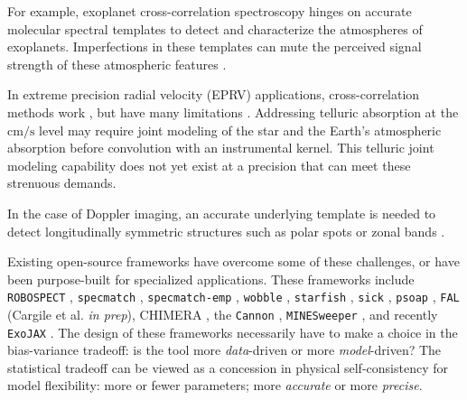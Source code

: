 \documentclass[modern]{aastex631}
\begin{document}
For example, exoplanet cross-correlation spectroscopy \citep{2013MNRAS.436L..35B} hinges on accurate molecular spectral templates to detect and characterize the atmospheres of exoplanets.  Imperfections in these templates can mute the perceived signal strength of these atmospheric features \citep{2015A&A...575A..20H}.

In extreme precision radial velocity (EPRV) applications, cross-correlation methods work \citep{2018A_A...620A..47D}, but have many limitations \citep{2022arXiv220110639Z}.  Addressing telluric absorption at the $\mathrm{cm/s}$ level may require joint modeling of the star and the Earth's atmospheric absorption before convolution with an instrumental kernel.  This telluric joint modeling capability does not yet exist at a precision that can meet these strenuous demands.

In the case of Doppler imaging, an accurate underlying template is needed to detect longitudinally symmetric structures \citep{1983PASP...95..565V,2021arXiv211006271L} such as polar spots \citep{roettenbacher16} or zonal bands \citep{Crossfield14,2021ApJ...906...64A}.

Existing open-source frameworks have overcome some of these challenges, or have been purpose-built for specialized applications.
These frameworks include \texttt{ROBOSPECT} \citep{2013PASP..125.1164W}, \texttt{specmatch} \citep{2015PhDT........82P}, \texttt{specmatch-emp} \citep{2017ApJ...836...77Y}, \texttt{wobble} \citep{2019AJ....158..164B}, \texttt{starfish} \citep{czekala15}, \texttt{sick} \citep{2016ApJS..223....8C}, \texttt{psoap} \citep{2017ApJ...840...49C}, \texttt{FAL} (Cargile et al. \emph{in prep}), CHIMERA \citep{2015ApJ...807..183L}, the \texttt{Cannon} \citep{2017ApJ...836....5H},  \texttt{MINESweeper} \citep{2020ApJ...900...28C}, and recently \texttt{ExoJAX} \citep{2022ApJS..258...31K}.
The design of these frameworks necessarily have to make a choice in the bias-variance tradeoff: is the tool more \emph{data}-driven or more \emph{model}-driven?  The statistical tradeoff can be viewed as a concession in physical self-consistency for model flexibility: more or fewer parameters; more \emph{accurate} or more \emph{precise}.
\end{document}
